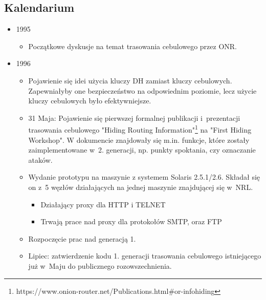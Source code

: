 \subsection{Kalendarium}

\begin{itemize}
  \item 1995
  \begin{itemize}
    \item Początkowe dyskusje na temat trasowania cebulowego przez ONR.
  \end{itemize}
  
  \item 1996
  \begin{itemize}
   \item Pojawienie się idei użycia kluczy DH zamiast kluczy cebulowych. Zapewniałyby one bezpieczeństwo na odpowiednim poziomie, lecz użycie kluczy cebulowych było efektywniejsze.
   \item 31 Maja: Pojawienie się pierwszej formalnej publikacji i~prezentacji trasowania cebulowego "Hiding Routing Information"\footnote{https://www.onion-router.net/Publications.html\#or-infohiding} na "First Hiding Workshop". W dokumencie znajdowały się m.in. funkcje, które zostały zaimplementowane w~2. generacji, np. punkty spoktania, czy oznaczanie ataków.
   \item Wydanie prototypu na maszynie z systemem Solaris 2.5.1/2.6. Składał się on z~5 węzłów działających na jednej maszynie znajdującej się w~NRL.
   \begin{itemize}
    \item Działający proxy dla HTTP i TELNET
    \item Trwają prace nad proxy dla protokołów SMTP, oraz FTP
   \end{itemize}

   \item Rozpoczęcie prac nad generacją 1. 
   \item Lipiec: zatwierdzenie kodu 1. generacji trasowania cebulowego istniejącego już w~Maju do publicznego rozowszechnienia.
  \end{itemize}
  

\end{itemize}

